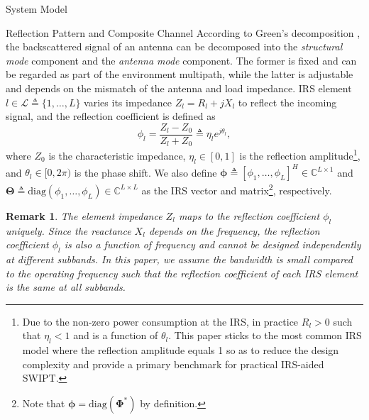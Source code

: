 \documentclass[journal]{IEEEtran}
\newtheorem{remark}{Remark}
\begin{document}
\begin{section}{System Model}
		\begin{subsection}{Reflection Pattern and Composite Channel}
			According to Green's decomposition \cite{Hansen1989}, the backscattered signal of an antenna can be decomposed into the \emph{structural mode} component and the \emph{antenna mode} component. The former is fixed and can be regarded as part of the environment multipath, while the latter is adjustable and depends on the mismatch of the antenna and load impedance. IRS element $l \in \mathcal{L} \triangleq \{1, \dots, L\}$ varies its impedance $Z_l = R_l + j X_l$ to reflect the incoming signal, and the reflection coefficient is defined as
			\begin{equation}
				\phi_l = \frac{Z_l - Z_0}{Z_l + Z_0} \triangleq \eta_l e^{j\theta_l},
			\end{equation}
			where $Z_0$ is the characteristic impedance, $\eta_l \in [0, 1]$ is the reflection amplitude\footnote{Due to the non-zero power consumption at the IRS, in practice $R_l > 0$ such that $\eta_l < 1$ and is a function of $\theta_l$. This paper sticks to the most common IRS model where the reflection amplitude equals \num{1} so as to reduce the design complexity and provide a primary benchmark for practical IRS-aided SWIPT.}, and $\theta_l \in [0,2\pi)$ is the phase shift. We also define $\boldsymbol{\phi} \triangleq [\phi_1, \dots, \phi_L]^H \in \mathbb{C}^{L \times 1}$ and $\boldsymbol{\Theta} \triangleq \mathrm{diag}(\phi_1, \dots, \phi_L) \in \mathbb{C}^{L \times L}$ as the IRS vector and matrix\footnote{Note that $\boldsymbol{\phi}=\mathrm{diag}(\boldsymbol{\Phi}^*)$ by definition.}, respectively.

			\begin{remark}\label{re:reflection_coefficient}
				The element impedance $Z_l$ maps to the reflection coefficient $\phi_l$ uniquely. Since the reactance $X_l$ depends on the frequency, the reflection coefficient $\phi_l$ is also a function of frequency and cannot be designed independently at different subbands. In this paper, we assume the bandwidth is small compared to the operating frequency such that the reflection coefficient of each IRS element is the same at all subbands.
			\end{remark}


\end{subsection}
\end{section}
\end{document}
